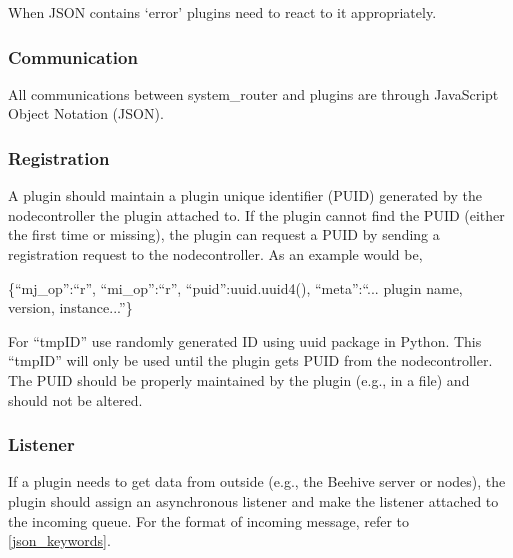 When JSON contains `error' plugins need to react to it appropriately.

\subsubsection{Communication}

All communications between system\_router and plugins are through JavaScript Object Notation (JSON).

\subsubsection{Registration}

A plugin should maintain a plugin unique identifier (PUID) generated by the nodecontroller the plugin attached to. If the plugin cannot find the PUID (either 
the first time or missing), the plugin can request a PUID by sending a registration request to the nodecontroller. As an example would be,

\begin{framed}
\noindent
\{``mj\_op'':``r'', ``mi\_op'':``r'', ``puid'':uuid.uuid4(), ``meta'':``... plugin name, version, instance...''\}
\end{framed}

For ``tmpID'' use randomly generated ID using uuid package in Python. This ``tmpID'' will only be used until the plugin gets PUID from the nodecontroller. The 
PUID should be properly maintained by the plugin (e.g., in a file) and should not be altered.

\subsubsection{Listener}

If a plugin needs to get data from outside (e.g., the Beehive server or nodes), the plugin should assign an asynchronous listener and make the listener 
attached to the incoming queue. For the format of incoming message, refer to \ref{json_keywords}.